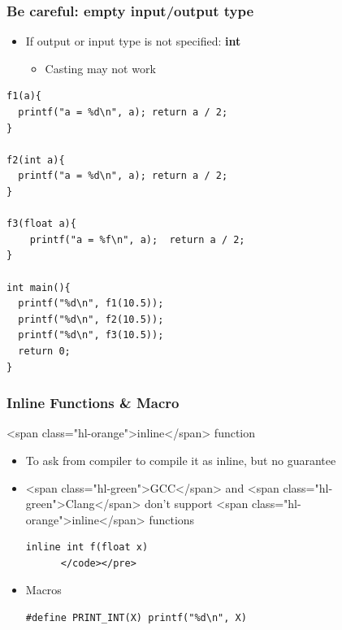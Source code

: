 \documentclass{../c-lecture}
\begin{document}
\begin{frame}[fragile]
  \frametitle{Be careful: empty input/output type}
  \begin{itemize}
    \item
      If output or input type is not specified:
      \textbf{\color{Orange} int}
    \begin{itemize}
      \item Casting may not work
    \end{itemize}
  \end{itemize}
  \begin{verbatim}
f1(a){
  printf("a = %d\n", a); return a / 2;
}

f2(int a){
  printf("a = %d\n", a); return a / 2;
}

f3(float a){
    printf("a = %f\n", a);  return a / 2;
}

int main(){
  printf("%d\n", f1(10.5));
  printf("%d\n", f2(10.5));
  printf("%d\n", f3(10.5));
  return 0;
}
  \end{verbatim}
\end{frame}

\begin{frame}[fragile]
  \frametitle{Inline Functions \& Macro}
    \item <span class="hl-orange">inline</span> function
    \begin{itemize}
      \item To ask from compiler to compile it as inline, but no guarantee
      \item
        <span class="hl-green">GCC</span> and
        <span class="hl-green">Clang</span> don't support
        <span class="hl-orange">inline</span> functions

    \begin{verbatim}
inline int f(float x)
      </code></pre>
    \end{verbatim}
    \item Macros
    \begin{verbatim}
#define PRINT_INT(X) printf("%d\n", X)
    \end{verbatim}
  \end{itemize}
\end{frame}
\end{document}
